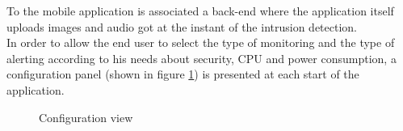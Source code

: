 \documentclass[conference, 11pt]{IEEEtran}
\begin{document}
To the mobile application is associated a back-end where the application itself uploads images and audio got at the instant of the intrusion detection.\\

In order to allow the end user to select the type of monitoring and the type of alerting according to his needs about security, CPU and power consumption, a configuration panel (shown in figure \ref{img:config}) is presented at each start of the application.\\

\begin{figure}[!ht]
\begin{center}
\caption{Configuration view}
\label{img:config}
\end{center}
\end{figure}
\end{document}
